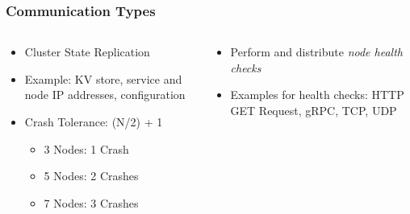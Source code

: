 \begin{frame}
	\frametitle{Communication Types}
	\begin{columns}[b]
		\begin{column}{0.5\textwidth}
			\begin{block}
				\begin{itemize}
					\item<2-> Cluster State Replication
					\item<3-> Example: KV store, service and node IP addresses, configuration
					\item<4-> Crash Tolerance: (N/2) + 1
						\begin{itemize}
							\item 3 Nodes: 1 Crash
							\item 5 Nodes: 2 Crashes
							\item 7 Nodes: 3 Crashes
						\end{itemize}
				\end{itemize}
			\end{block}
		\end{column}
		\begin{column}{0.5\textwidth}
			\begin{block}
				\begin{itemize}
					\item<5-> Perform and distribute \emph{node health checks}
					\item<6-> Examples for health checks: HTTP GET Request, gRPC, TCP, UDP
				\end{itemize}
			\end{block}
		\end{column}
	\end{columns}
\end{frame}

